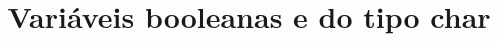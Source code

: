 \documentclass[a4paper, 12pt]{article}
\title{\textbf{Variáveis booleanas e do tipo char}}
\begin{document}
\maketitle %

\section{}
\end{document}
